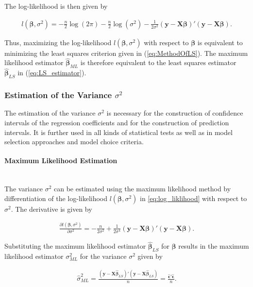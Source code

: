 \documentclass[10pt,a4paper]{article}
\newcommand{\subsubsubsection}[1]{\paragraph{#1}\mbox{}\\}
\begin{document}
The log-likelihood is then given by

\begin{align} \label{eq:log_liklihood}
	l(\boldsymbol{\beta}, \sigma^2) = -\frac{n}{2}\log(2\pi) - \frac{n}{2}\log(\sigma^2) - \frac{1}{2\sigma^2}(\boldsymbol{y} - \boldsymbol{X} \boldsymbol{\beta})'(\boldsymbol{y} - \boldsymbol{X} \boldsymbol{\beta}).
\end{align}

Thus, maximizing the log-likelihood $l(\boldsymbol{\beta}, \sigma^2)$ with respect to $\boldsymbol{\beta}$ is equivalent to minimizing the least squares criterion given in (\ref{eq:MethodOfLS}). The maximum likelihood estimator $\boldsymbol{\hat{\beta}}_{ML}$ is therefore equivalent to the least squares estimator $\boldsymbol{\hat{\beta}}_{LS}$ in (\ref{eq:LS_estimator}).

\subsubsection{Estimation of the Variance $\sigma^2$}

The estimation of the variance $\sigma^2$ is necessary for the construction of confidence intervals of the regression coefficients and for the construction of prediction intervals. It is further used in all kinds of statistical tests as well as in model selection approaches and model choice criteria. \cite{blobel2013statistische}

\subsubsubsection{Maximum Likelihood Estimation}

The variance $\sigma^2$ can be estimated using the maximum likelihood method by differentiation of the log-likelihood $l(\boldsymbol{\beta}, \sigma^2)$ in \ref{eq:log_liklihood} with respect to $\sigma^2$. The derivative is given by

\begin{align} \label{eq:log_likelihood_derivative_sigma}
	\frac{\partial l(\boldsymbol{\beta}, \sigma^2)}{\partial \sigma^2} = -\frac{n}{2\sigma^2} + \frac{1}{2\sigma^4}(\boldsymbol{y} - \boldsymbol{X} \boldsymbol{\beta})'(\boldsymbol{y} - \boldsymbol{X}\boldsymbol{\beta}). 
\end{align}

Substituting the maximum likelihood estimator $\boldsymbol{\hat{\beta}}_{LS}$ for $\boldsymbol{\beta}$ results in the maximum likelihood estimator $\sigma^2_{ML}$ for the variance $\sigma^2$ given by

\begin{align} \label{eq:sigma_ML}
	\hat \sigma^2_{ML} = 
		\frac{(\boldsymbol{y} - \boldsymbol{X} \boldsymbol{\hat{\beta}}_{LS})'(\boldsymbol{y} - \boldsymbol{X} \boldsymbol{\hat{\beta}}_{LS})}{n} = \frac{\boldsymbol{\hat{\epsilon}}' \boldsymbol{\hat{\epsilon}}}{n}.
\end{align}
\end{document}
